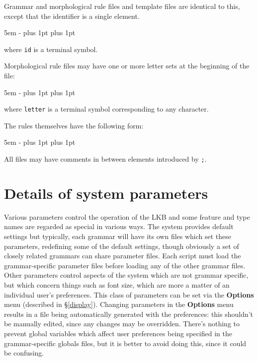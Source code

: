 \documentclass[12pt]{report}
\begin{document}
Grammar and morphological rule files 
and template files are identical to this, 
except that the identifier is a single element.
\begin{list}{}
   {\leftmargin 5em
    \itemindent -\leftmargin
    \itemsep 0pt plus 1pt
    \parsep 0pt plus 1pt}
\end{list}
where {\tt id} is a terminal symbol.

Morphological rule files may have one or more letter sets at the 
beginning of the file:
\begin{list}{}
   {\leftmargin 5em
    \itemindent -\leftmargin
    \itemsep 0pt plus 1pt
    \parsep 0pt plus 1pt}
\end{list}
where {\tt letter} is a terminal symbol corresponding to any character.

The rules themselves have the following form:
\begin{list}{}
   {\leftmargin 5em
    \itemindent -\leftmargin
    \itemsep 0pt plus 1pt
    \parsep 0pt plus 1pt}
\end{list}

All files may have comments in between elements introduced by {\tt ;}.


\chapter{Details of system parameters}
\label{glob}

Various parameters control the operation of the LKB and some feature and
type names are regarded as special in various ways.
The system provides default settings
but typically, each grammar will have its own files which set these
parameters, redefining some of the default settings, though
obviously a set of closely related grammars can share parameter
files.  Each script must load the grammar-specific parameter files
before loading any of the other grammar files.
Other parameters control aspects of the system which
are not grammar specific, but which concern things such as 
font size, which are more a matter of an individual user's preferences.
This class of parameters can be set via the {\bf Options}
menu (described in \S\ref{display}).
Changing parameters in the {\bf Options} menu results in
a file being automatically generated with the preferences:
this shouldn't be manually edited, since any changes may be 
overridden.  There's nothing to prevent global variables which affect
user preferences being specified in the grammar-specific globals
files, but it is better to avoid doing this, since it could be confusing.
\end{document}
